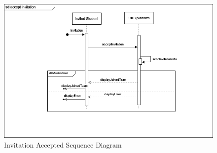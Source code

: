 \begin{center}
    \begin{figure} [H]
        \begin{center}
            \includegraphics[width=0.9\linewidth]{Images/SequenceDiagrams/SD_6.png}
            \caption{Invitation Accepted Sequence Diagram}
            \label{fig: invitation_accepted_seq_diag}
        \end{center}
    \end{figure}
\end{center}

